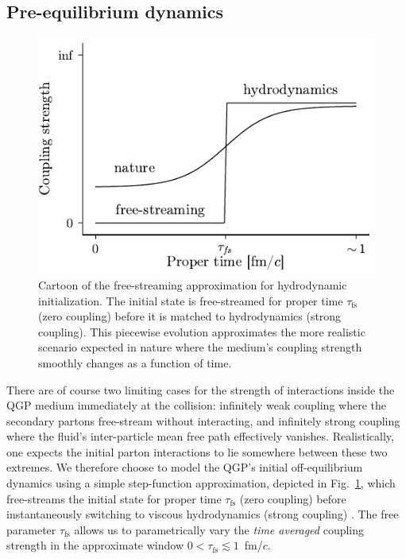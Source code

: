 \documentclass[aps,prc,reprint,amsmath,nofootinbib]{revtex4-1}
\newcommand{\taufs}{\tau_\mathrm{fs}}
\begin{document}
\subsection{Pre-equilibrium dynamics}

\begin{figure}[b]
  \includegraphics{coupling}
  \caption{Cartoon of the free-streaming approximation for hydrodynamic initialization. The initial state is free-streamed for proper time $\taufs$ (zero coupling) before it is matched to hydrodynamics (strong coupling). This piecewise evolution approximates the more realistic scenario expected in nature where the medium's coupling strength smoothly changes as a function of time.}
  \label{fig:coupling}
\end{figure}

There are of course two limiting cases for the strength of interactions inside the QGP medium immediately at the collision: infinitely weak coupling where the secondary partons free-stream without interacting, and infinitely strong coupling where the fluid's inter-particle mean free path effectively vanishes.
Realistically, one expects the initial parton interactions to lie somewhere between these two extremes.
We therefore choose to model the QGP's initial off-equilibrium dynamics using a simple step-function approximation, depicted in Fig.~\ref{fig:coupling}, which free-streams the initial state for proper time $\taufs$ (zero coupling) before instantaneously switching to viscous hydrodynamics (strong coupling) \cite{Liu:2015nwa, Broniowski:2008qk}.
The free parameter $\taufs$ allows us to parametrically vary the \emph{time averaged} coupling strength in the approximate window $0 < \taufs \lesssim1$~fm/$c$.
\end{document}
